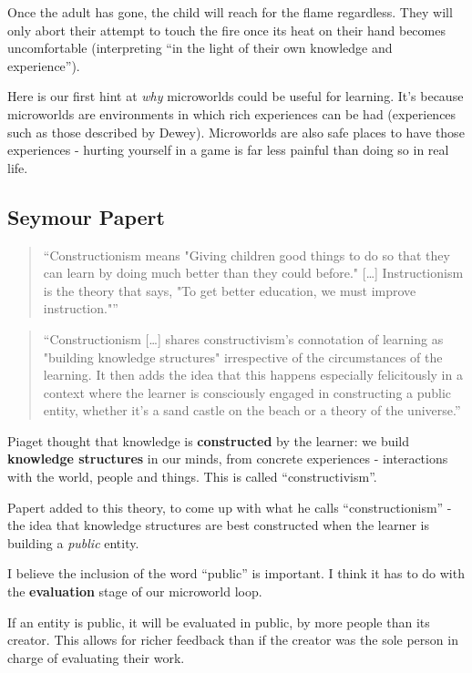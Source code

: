 Once the adult has gone, the child will reach for the flame regardless.
They will only abort their attempt to touch the fire once its heat on
their hand becomes uncomfortable (interpreting ``in the light of their own knowledge and experience'').

Here is our first hint at \emph{why} microworlds could be useful for
learning. It's because microworlds are environments in which rich
experiences can be had (experiences such as those described by Dewey).
Microworlds are also safe places to have those experiences - hurting
yourself in a game is far less painful than doing so in real life.

\subsection{Seymour Papert}

\begin{quote}
``Constructionism means "Giving children good things to do so that they
can learn by doing much better than they could before." {[}\ldots{}{]}
Instructionism is the theory that says, "To get better education, we
must improve instruction."''\cite{convsinst}
\end{quote}

\begin{quote}
``Constructionism {[}\ldots{}{]} shares constructivism's connotation of
learning as "building knowledge structures" irrespective of the
circumstances of the learning. It then adds the idea that this happens
especially felicitously in a context where the learner is consciously
engaged in constructing a public entity, whether it's a sand castle on
the beach or a theory of the universe.''\cite{sitconst}
\end{quote}

Piaget thought that knowledge is \textbf{constructed} by the learner: we
build \textbf{knowledge structures} in our minds, from concrete
experiences - interactions with the world, people and things. This is called ``constructivism''.

Papert added to this theory, to come up with what he calls
``constructionism'' - the idea that knowledge structures are best
constructed when the learner is building a \emph{public} entity.

I believe the inclusion of the word ``public'' is important. I think it
has to do with the \textbf{evaluation} stage of our microworld loop.

If an entity is public, it will be evaluated in public, by more people
than its creator. This allows for richer feedback than if the creator
was the sole person in charge of evaluating their work.

